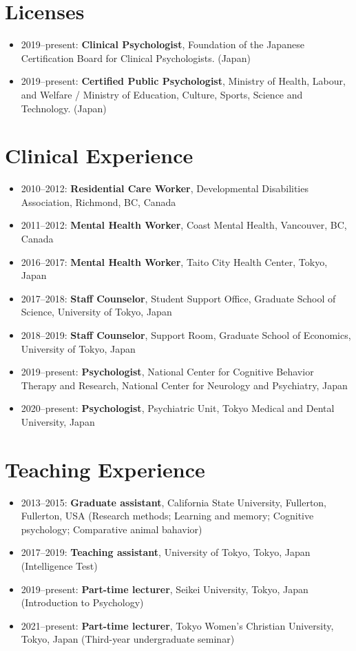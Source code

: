 \documentclass{article}
\begin{document}
\section{Licenses}
\begin{itemize}
	\item 2019--present: \textbf{Clinical Psychologist}, Foundation of the Japanese Certification Board for Clinical Psychologists. (Japan)
	\item 2019--present: \textbf{Certified Public Psychologist}, Ministry of Health, Labour, and Welfare / Ministry of Education, Culture, Sports, Science and Technology. (Japan)
\end{itemize} 

\section{Clinical Experience}
\begin{itemize}
	\item 2010--2012: \textbf{Residential Care Worker}, Developmental Disabilities Association, Richmond, BC, Canada
	\item 2011--2012: \textbf{Mental Health Worker}, Coast Mental Health, Vancouver, BC, Canada
	\item 2016--2017: \textbf{Mental Health Worker}, Taito City Health Center, Tokyo, Japan
	\item 2017--2018: \textbf{Staff Counselor}, Student Support Office, Graduate School of Science, University of Tokyo, Japan
	\item 2018--2019: \textbf{Staff Counselor}, Support Room, Graduate School of Economics, University of Tokyo, Japan
	\item 2019--present: \textbf{Psychologist}, National Center for Cognitive Behavior Therapy and Research, National Center for Neurology and Psychiatry, Japan
	\item 2020--present: \textbf{Psychologist}, Psychiatric Unit, Tokyo Medical and Dental University, Japan
\end{itemize}

\section{Teaching Experience}
\begin{itemize}
	\item 2013--2015: \textbf{Graduate assistant}, California State University, Fullerton, Fullerton, USA (Research methods; Learning and memory; Cognitive psychology; Comparative animal bahavior)
	\item 2017--2019: \textbf{Teaching assistant}, University of Tokyo, Tokyo, Japan (Intelligence Test)
	\item 2019--present: \textbf{Part-time lecturer}, Seikei University, Tokyo, Japan (Introduction to Psychology)
	\item 2021--present: \textbf{Part-time lecturer}, Tokyo Women's Christian University, Tokyo, Japan (Third-year undergraduate seminar)
\end{itemize}
\end{document}
